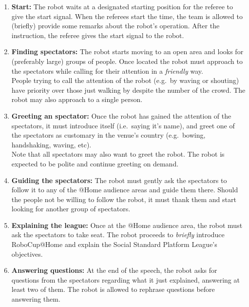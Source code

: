 \begin{enumerate}
	\item \textbf{Start:} The robot waits at a designated starting position for the referee to give the start signal. When the referees start the time, the team is allowed to (briefly) provide some remarks about the robot's operation. After the instruction, the referee gives the start signal to the robot.\\

	\item \textbf{Finding spectators:} The robot starts moving to an open area and looks for (preferably large) groups of people. Once located the robot must approach to the spectators while calling for their attention in a \emph{friendly} way.\\

	People trying to call the attention of the robot (e.g.~by waving or shouting) have priority over those just walking by despite the number of the crowd. The robot may also approach to a single person.\\

	\item \textbf{Greeting an spectator:} Once the robot has gained the attention of the spectators, it must introduce itself (i.e.~saying it's name), and greet one of the spectators as customary in the venue's country (e.g.~bowing, handshaking, waving, etc).\\

	Note that all spectators may also want to greet the robot. The robot is expected to be polite and continue greeting on demand.\\

	\item \textbf{Guiding the spectators:} The robot must gently ask the spectators to follow it to any of the @Home audience areas and guide them there. Should the people not be willing to follow the robot, it must thank them and start looking for another group of spectators.\\

	\item \textbf{Explaining the league:} Once at the @Home audience area, the robot must ask the spectators to take seat. The robot proceeds to \textit{briefly} introduce RoboCup@Home and explain the Social Standard Platform League's objectives. \\

	\item \textbf{Answering questions:} At the end of the speech, the robot asks for questions from the spectators regarding what it just explained, answering at least two of them. The robot is allowed to rephrase questions before answering them.\\

\end{enumerate}


